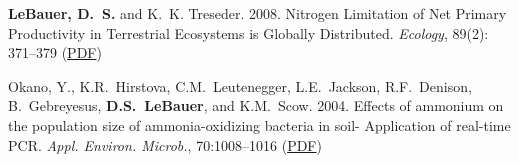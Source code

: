\documentclass[10pt,twoside]{article}
\begin{document}
\begin{itemize*}
\item \noindent%
\textbf{LeBauer, D.~S.} and K.~K. Treseder. 2008. Nitrogen Limitation of Net Primary Productivity in
Terrestrial Ecosystems is Globally Distributed. \textit{Ecology}, 89(2): 371--379
\ifpdf %
(\href{https://://netfiles.uiuc.edu/dlebauer/www/lebauer2008nln.pdf}{PDF})
\fi %

\item \noindent%
Okano, Y., K.R.~Hirstova, C.M.~Leutenegger, L.E.~Jackson, R.F.~Denison, B.~Gebreyesus, \textbf{D.S.~LeBauer}, and K.M.~Scow. 2004. Effects of ammonium on the population size of ammonia-oxidizing bacteria in soil- Application of real-time PCR. \textit{Appl. Environ. Microb.}, 70:1008--1016
\ifpdf %
(\href{https://://netfiles.uiuc.edu/dlebauer/www/okano2004art.pdf}{PDF})
\fi %
\end{itemize*}
\end{document}

